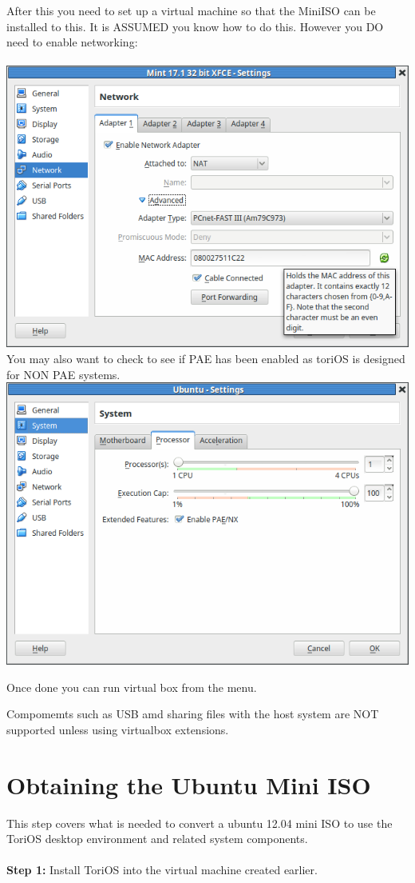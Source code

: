 \documentclass[12pt,a4paper]{book}
\begin{document}
After this you need to set up a virtual machine so that the MiniISO can be installed to this.   It is ASSUMED you know how to do this.  However you DO need to enable networking:\\ \\
\includegraphics[width=0.7\linewidth]{screen-shots/virtualbox-network} \\

You may also want to check to see if PAE has been enabled as toriOS is designed for NON PAE systems.\\
\includegraphics[width=0.7\linewidth]{screen-shots/Virtualbox-enablePAE}


Once done you can run virtual box from the menu.

Compomemts such as USB amd sharing files with the host system are NOT supported unless using virtualbox extensions.  \\



\chapter{Obtaining the Ubuntu Mini ISO}

This step covers what is needed to convert a ubuntu 12.04 mini ISO to use the ToriOS desktop environment and related system components.\\ \\
\textbf{
Step 1:} Install ToriOS into the virtual machine created earlier. 
\end{document}
